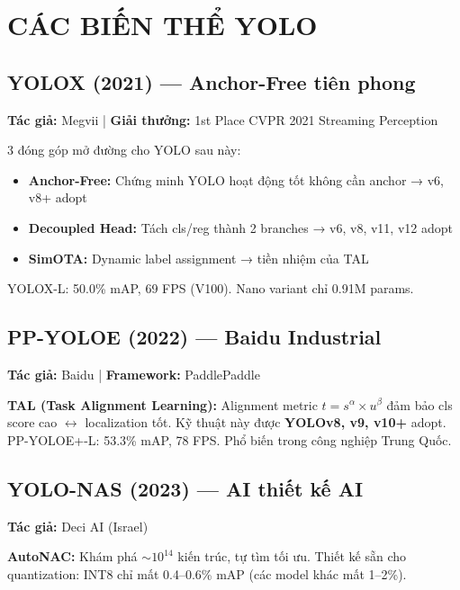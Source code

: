 \chapter{CÁC BIẾN THỂ YOLO}

\section{YOLOX (2021) — Anchor-Free tiên phong}
\textbf{Tác giả:} Megvii | \textbf{Giải thưởng:} 1st Place CVPR 2021 Streaming Perception

3 đóng góp mở đường cho YOLO sau này:
\begin{itemize}
    \item \textbf{Anchor-Free:} Chứng minh YOLO hoạt động tốt không cần anchor → v6, v8+ adopt
    \item \textbf{Decoupled Head:} Tách cls/reg thành 2 branches → v6, v8, v11, v12 adopt
    \item \textbf{SimOTA:} Dynamic label assignment → tiền nhiệm của TAL
\end{itemize}
YOLOX-L: 50.0\% mAP, 69 FPS (V100). Nano variant chỉ 0.91M params.

\section{PP-YOLOE (2022) — Baidu Industrial}
\textbf{Tác giả:} Baidu | \textbf{Framework:} PaddlePaddle

\textbf{TAL (Task Alignment Learning):} Alignment metric $t = s^\alpha \times u^\beta$ đảm bảo cls score cao $\leftrightarrow$ localization tốt. Kỹ thuật này được \textbf{YOLOv8, v9, v10+} adopt. PP-YOLOE+-L: 53.3\% mAP, 78 FPS. Phổ biến trong công nghiệp Trung Quốc.

\section{YOLO-NAS (2023) — AI thiết kế AI}
\textbf{Tác giả:} Deci AI (Israel)

\textbf{AutoNAC:} Khám phá $\sim 10^{14}$ kiến trúc, tự tìm tối ưu. Thiết kế sẵn cho quantization: INT8 chỉ mất 0.4--0.6\% mAP (các model khác mất 1--2\%).


